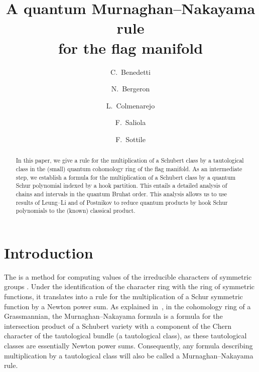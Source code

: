 \documentclass[12pt,oneside,reqno]{amsart}
\title[Quantum Murnaghan--Nakayama rule]{A quantum Murnaghan--Nakayama rule\\ for the flag manifold}
\author[Benedetti]{C.~Benedetti}
\author[Bergeron]{N.~Bergeron}
\author[Colmenarejo]{L.~Colmenarejo}
\author[Saliola]{F.~Saliola}
\author[Sottile]{F.~Sottile}
\theoremstyle{definition}
\numberwithin{equation}{section}
\newcommand{\defcolor}[1]{{\color{RoyalBlue}#1}}
\newcommand{\demph}[1]{\defcolor{{\sl #1}}}
\begin{document}
\begin{abstract}
    In this paper, we give a rule for the multiplication of a Schubert class by a tautological
    class in the (small) quantum cohomology ring of the flag manifold.
    As an intermediate step, we establish a formula for the multiplication of
    a Schubert class by a quantum Schur polynomial indexed by a hook partition.
    This entails a detailed analysis of chains and intervals in the
    quantum Bruhat order.
    This analysis allows us to use results of Leung--Li  and of Postnikov  to reduce quantum
    products by hook Schur polynomials to the (known) classical product.
\end{abstract}

\maketitle

\section{Introduction}

The \demph{Murnaghan--Nakayama rule} is a method for computing values of the
irreducible characters of symmetric groups \cite{Mu37,Na41a,Na41b}.
Under the identification of the character ring with the ring of symmetric
functions, it translates into a rule for the multiplication of a Schur
symmetric function by a Newton power sum.
As explained in~\cite[Sect.~2]{MorrisonSottile}, in the cohomology ring of a Grassmannian, the
Murnaghan--Nakayama formula is a formula for the intersection product of a Schubert variety
with a component of the Chern character of the tautological bundle (a tautological class), as these tautological classes are
essentially Newton power sums.
Consequently, any formula describing multiplication by a tautological class will also be called a Murnaghan--Nakayama rule.
\end{document}
